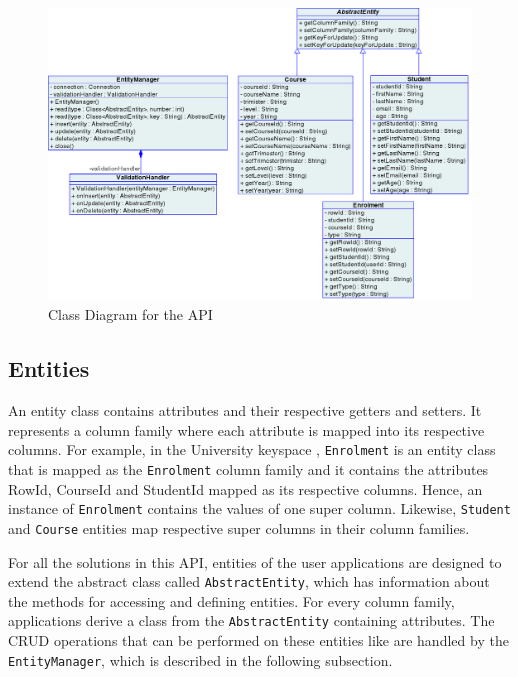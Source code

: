 \begin{figure}[h] 
	\centering
	\includegraphics[width=\textwidth]{./figure/Solutions/FinalClassDiagram.png}
	\caption{Class Diagram for the \ac{API}}\label{f:classDiagram}
\end{figure}


	\subsection{Entities} 
	An entity class contains attributes and their respective  getters and setters.
	 It represents a column family where each attribute is mapped into its
	 respective columns.  For example,  in the University keyspace , 
	\texttt{Enrolment} is an entity class that is mapped as the
	\texttt{Enrolment} column family and it contains the attributes RowId,
	CourseId and StudentId  mapped as its respective columns. Hence, an instance of
	\texttt{Enrolment} contains the values of one super column. Likewise, 
	\texttt{Student} and \texttt{Course} entities  map respective super columns in
	their column families.

	For all the solutions in this \ac{API},  entities of the user applications are
	designed to extend the abstract class called \texttt{AbstractEntity},  which has
	information about the  methods for accessing and defining  entities.  For
	every column family, applications derive a class from the
	\texttt{AbstractEntity} containing attributes.
	The \ac{CRUD} operations that can be performed on these entities like   are
	handled by the \texttt{EntityManager},  which is described in the following
	subsection.
		
